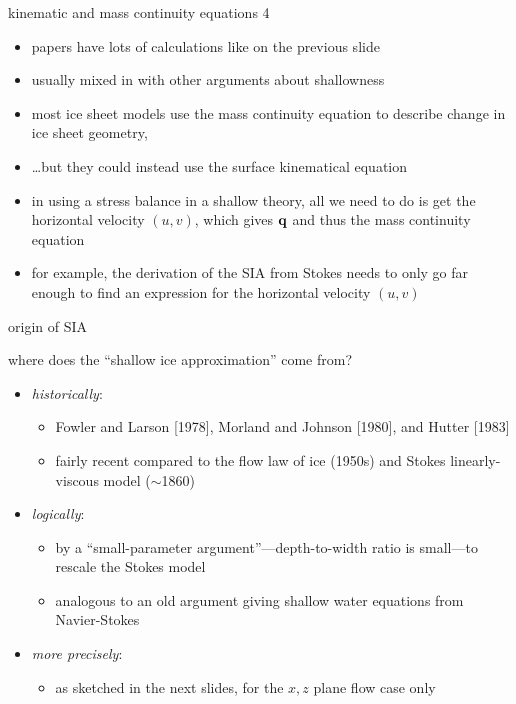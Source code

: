 \begin{frame}{kinematic and mass continuity equations 4}

\begin{itemize}
\item papers have lots of calculations like on the previous slide
\item usually mixed in with other arguments about shallowness
\item most ice sheet models use the mass continuity equation to describe change in ice sheet geometry,
\item \dots but they could instead use the surface kinematical equation
\item in using a stress balance in a shallow theory, all we need to do is get the horizontal velocity $(u,v)$, which gives $\mathbf{q}$ and thus the mass continuity equation
\item for example, the derivation of the SIA from Stokes needs to only go far enough to find an expression for the horizontal velocity $(u,v)$
\end{itemize}
\end{frame}


\begin{frame}{origin of SIA}

where does the ``shallow ice approximation'' come from?
\begin{itemize}
\item \emph{historically}: 
  \begin{itemize}
    \item Fowler and Larson [1978]\nocite{FowlerLarson1978}, Morland and Johnson [1980]\nocite{MorlandJohnson}, and Hutter [1983]\nocite{Hutter}
    \item fairly recent compared to the flow law of ice (1950s) and Stokes linearly-viscous model ($\sim$1860)
  \end{itemize}
\item \emph{logically}:
  \begin{itemize}
    \item by a ``small-parameter argument''---depth-to-width ratio is small---to rescale the Stokes model
    \item analogous to an old argument giving shallow water equations from Navier-Stokes
  \end{itemize} 
\item \emph{more precisely}:
  \begin{itemize}
    \item as sketched in the next slides, for the $x,z$ plane flow case only
  \end{itemize}
\end{itemize}
\end{frame}


